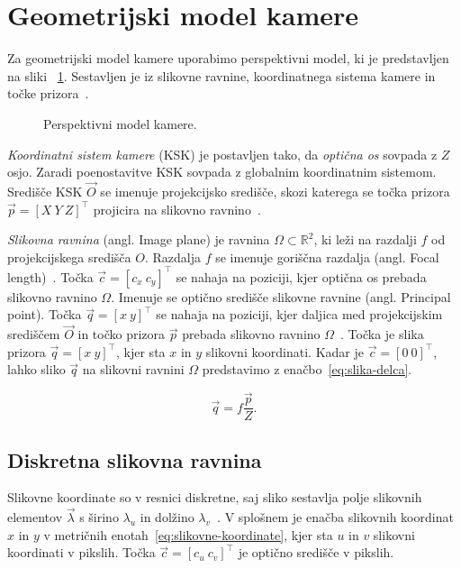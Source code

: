 \section{Geometrijski model kamere}\label{sec:model-kamere}
Za geometrijski model kamere uporabimo perspektivni model, ki je predstavljen na sliki            ~\ref{fig:perspektivni-model}. Sestavljen je iz slikovne ravnine, koordinatnega sistema kamere in točke prizora~\cite{trucco1998introductory}.


\begin{figure}[htb]
\centering

\caption[Perspektivni model kamere]{Perspektivni model kamere.}
\label{fig:perspektivni-model}
\end{figure}


\emph{Koordinatni sistem kamere} (KSK) je postavljen tako, da \emph{optična os} sovpada z $Z$ osjo. Zaradi poenostavitve KSK sovpada z globalnim koordinatnim sistemom.  Središče KSK $\vec{O}$ se imenuje projekcijsko središče, skozi katerega se točka prizora $\vec{p} = \left[ X~Y~Z \right]^\top$ projicira na slikovno ravnino~\cite{trucco1998introductory}.

\emph{Slikovna ravnina} (angl. Image plane) je ravnina $\varOmega \subset \mathbb{R}^2$, ki leži na razdalji $f$ od projekcijskega središča $O$. Razdalja $f$ se imenuje goriščna razdalja (angl. Focal length)~\cite{trucco1998introductory}. Točka $\vec{c} = \left[c_x~c_y \right]^\top$ se nahaja na poziciji, kjer optična os prebada slikovno ravnino $\varOmega$. Imenuje se optično središče slikovne ravnine (angl. Principal point). Točka $\vec{q} = [x~y]^\top$ se nahaja na poziciji, kjer daljica med projekcijskim središčem $\vec{O}$ in točko prizora $\vec{p}$ prebada slikovno ravnino $\varOmega$~\cite{trucco1998introductory}. Točka je slika prizora $\vec{q} = [x~y]^\top$, kjer sta $x$ in $y$ slikovni koordinati. Kadar je $\vec{c} = \left[0~0\right]^\top$, lahko sliko $\vec{q}$ na slikovni ravnini $\varOmega$ predstavimo z enačbo~\eqref{eq:slika-delca}.

\begin{equation}
	\vec{q} = f \frac{\vec{p}}{Z}.
    \label{eq:slika-delca}
\end{equation}

\subsection{Diskretna slikovna ravnina}
Slikovne koordinate so v resnici diskretne, saj sliko sestavlja polje slikovnih elementov $\vec{\lambda}$ s širino $\lambda_u$ in dolžino $\lambda_v$~\cite{trucco1998introductory}. V splošnem je enačba slikovnih koordinat $x$ in $y$ v metričnih enotah~\eqref{eq:slikovne-koordinate}, kjer sta $u$ in $v$ slikovni koordinati v pikslih. Točka $\vec{c} = \left[c_u~c_v \right]^\top$ je optično središče v pikslih.

